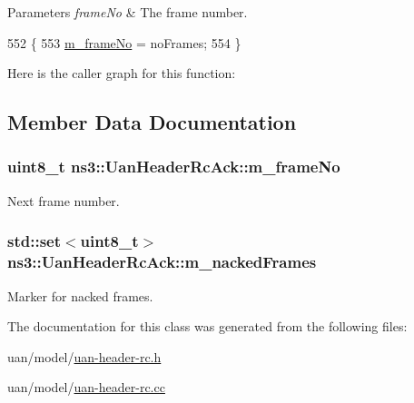 \begin{DoxyParams}{Parameters}
{\em frame\+No} & The frame number. \\
\hline
\end{DoxyParams}

\begin{DoxyCode}
552 \{
553   \hyperlink{classns3_1_1UanHeaderRcAck_a2611c1a8084eb27d207a4c223bfda5cb}{m\_frameNo} = noFrames;
554 \}
\end{DoxyCode}


Here is the caller graph for this function\+:




\subsection{Member Data Documentation}
\subsubsection[{\texorpdfstring{m\+\_\+frame\+No}{m_frameNo}}]{\setlength{\rightskip}{0pt plus 5cm}uint8\+\_\+t ns3\+::\+Uan\+Header\+Rc\+Ack\+::m\+\_\+frame\+No\hspace{0.3cm}{\ttfamily [private]}}\hypertarget{classns3_1_1UanHeaderRcAck_a2611c1a8084eb27d207a4c223bfda5cb}{}\label{classns3_1_1UanHeaderRcAck_a2611c1a8084eb27d207a4c223bfda5cb}


Next frame number. 

\subsubsection[{\texorpdfstring{m\+\_\+nacked\+Frames}{m_nackedFrames}}]{\setlength{\rightskip}{0pt plus 5cm}std\+::set$<$uint8\+\_\+t$>$ ns3\+::\+Uan\+Header\+Rc\+Ack\+::m\+\_\+nacked\+Frames\hspace{0.3cm}{\ttfamily [private]}}\hypertarget{classns3_1_1UanHeaderRcAck_a59ea630450a15c8afb68ec426bfd7d54}{}\label{classns3_1_1UanHeaderRcAck_a59ea630450a15c8afb68ec426bfd7d54}


Marker for nacked frames. 



The documentation for this class was generated from the following files\+:\begin{DoxyCompactItemize}
\item 
uan/model/\hyperlink{uan-header-rc_8h}{uan-\/header-\/rc.\+h}\item 
uan/model/\hyperlink{uan-header-rc_8cc}{uan-\/header-\/rc.\+cc}\end{DoxyCompactItemize}
